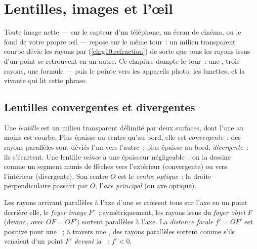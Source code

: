 \chapter{Lentilles, images et l'œil}\label{ch:g11:lenses-and-eye}

Toute image nette --- sur le capteur d'un téléphone, un écran de cinéma,
ou le fond de votre propre œil --- repose sur le même tour~: un milieu
transparent courbe dévie les rayons par 
(\cref{ch:g10:refraction}) de sorte que tous les rayons issus d'un point
se retrouvent en un autre. Ce chapitre dompte le tour~: une
, trois rayons, une formule --- puis le pointe
vers les appareils photo, les lunettes, et la 
vivante qui lit cette phrase.

\section{Lentilles convergentes et divergentes}

\begin{definition}\label{def:g11:lenses-and-eye:lens}
Une \emph{lentille} est un milieu transparent délimité
par deux surfaces, dont l'une au moins est courbe. Plus épaisse au
centre qu'au bord, elle est \emph{convergente}~: des rayons parallèles sont déviés l'un vers l'autre~;
plus épaisse au bord, \emph{divergente}~: ils
s'écartent. Une lentille \emph{mince} a une
épaisseur négligeable~: on la dessine comme un segment munis de
flèches vers l'extérieur (convergente) ou vers l'intérieur
(divergente). Son centre $O$ est le \emph{centre
optique}~; la droite perpendiculaire passant par
$O$, l'\emph{axe principal} (ou axe optique).
\end{definition}

\begin{definition}\label{def:g11:lenses-and-eye:focal}
Les rayons arrivant parallèles à l'axe d'une
 se croisent tous sur l'axe en un
point derrière elle, le \emph{foyer image} $F'$~;
symétriquement, les rayons issus du \emph{foyer objet} $F$ (devant, avec
$OF = OF'$) sortent parallèles à l'axe. La \emph{distance
focale} $f' = \overline{OF'}$ est positive pour
une ~; à travers une
, des rayons parallèles sortent comme
s'ils venaient d'un point $F'$ \emph{devant} la
~: $f' < 0$.
\end{definition}

